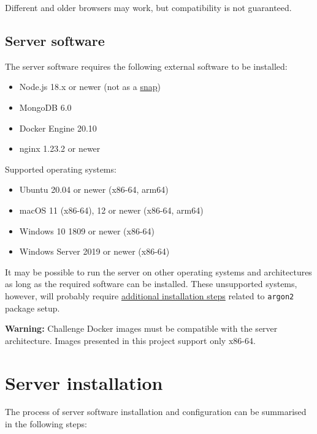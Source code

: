 Different and older browsers may work, but compatibility is not guaranteed.

\subsection{Server software} \label{chap:server-soft}

The server software requires the following external software to be installed:

\begin{itemize}
    \item Node.js 18.x or newer (not as a \href{https://snapcraft.io/node}{snap})
    \item MongoDB 6.0
    \item Docker Engine 20.10
    \item nginx 1.23.2 or newer
\end{itemize}

Supported operating systems:

\begin{itemize}
    \item Ubuntu 20.04 or newer (x86-64, arm64)
    \item macOS 11 (x86-64), 12 or newer (x86-64, arm64)
    \item Windows 10 1809 or newer (x86-64)
    \item Windows Server 2019 or newer (x86-64)
\end{itemize}

It may be possible to run the server on other operating systems and architectures as long as the required software can be installed. These unsupported systems, however, will probably require \href{https://github.com/ranisalt/node-argon2/tree/v0.30.3#before-installing}{additional installation steps} related to \texttt{argon2} package setup.

\textbf{Warning:} Challenge Docker images must be compatible with the server architecture. Images presented in this project support only x86-64.

\section{Server installation}

The process of server software installation and configuration can be summarised in the following steps:

